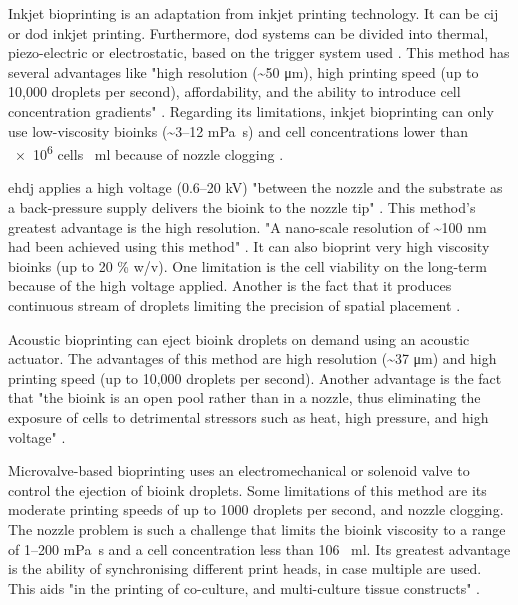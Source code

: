 Inkjet bioprinting is an adaptation from inkjet printing technology. It can be \gls{cij} or \gls{dod} inkjet printing. Furthermore, \gls{dod} systems can be divided into thermal, piezo-electric or electrostatic, based on the trigger system used \cite{Vijayavenkataraman2018_bioprinting_tissues_organs_regen_med}. This method has several advantages like "high resolution (\textasciitilde 50 \si{\micro\meter}), high printing speed (up to 10,000 droplets per second), affordability, and the ability to introduce cell concentration gradients" \cite{Vijayavenkataraman2018_bioprinting_tissues_organs_regen_med}. Regarding its limitations, inkjet bioprinting can only use low-viscosity bioinks (\textasciitilde \numrange{3}{12} \si{\milli\pascal\second}) and cell concentrations lower than \num{e6} cells \si{\per\milli\litre} because of nozzle clogging \cite{Vijayavenkataraman2018_bioprinting_tissues_organs_regen_med}.

\gls{ehdj} applies a high voltage (\numrange{0.6}{20} \si{\kilo\volt}) "between the nozzle and the substrate as a back-pressure supply delivers the bioink to the nozzle tip" \cite{Vijayavenkataraman2018_bioprinting_tissues_organs_regen_med}. This method's greatest advantage is the high resolution. "A nano-scale resolution of \textasciitilde 100 \si{\nano\meter} had been achieved using this method" \cite{Vijayavenkataraman2018_bioprinting_tissues_organs_regen_med}. It can also bioprint very high viscosity bioinks (up to 20 \% w/v). One limitation is the cell viability on the long-term because of the high voltage applied. Another is the fact that it produces continuous stream of droplets limiting the precision of spatial placement \cite{Vijayavenkataraman2018_bioprinting_tissues_organs_regen_med}.

Acoustic bioprinting can eject bioink droplets on demand using an acoustic actuator. The advantages of this method are high resolution (\textasciitilde 37 \si{\micro\meter}) and high printing speed (up to 10,000 droplets per second). Another advantage is the fact that "the
bioink is an open pool rather than in a nozzle, thus eliminating the exposure of cells to detrimental stressors such as heat, high pressure, and high voltage" \cite{Vijayavenkataraman2018_bioprinting_tissues_organs_regen_med}.

Microvalve-based bioprinting uses an electromechanical or solenoid valve to control the ejection of bioink droplets. Some limitations of this method are its moderate printing speeds of up to 1000 droplets per second, and nozzle clogging. The nozzle problem is such a challenge that limits the bioink viscosity to a range of \numrange{1}{200} \si{\milli\pascal\second} and a cell concentration less than 106 \si{\per\milli\litre}. Its greatest advantage is the ability of synchronising different print heads, in case multiple are used. This aids "in the printing of co-culture, and multi-culture tissue constructs" \cite{Vijayavenkataraman2018_bioprinting_tissues_organs_regen_med}.

